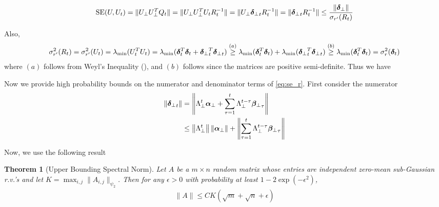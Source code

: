 \documentclass[10pt]{article}
\newtheorem{theorem}{Theorem}
\newcommand{\norm}[1]{\left\|#1\right\|}
\newcommand{\SE}{\mathrm{SE}}
\begin{document}
\begin{align*}
\SE(U, U_t) = \|U_\perp U_\perp^T Q_t\| = \|U_\perp U_\perp^T U_t R_t^{-1}\|  = \|U_\perp \utsin_t R_t^{-1}\| = \|\utsin_t R_t^{-1}\| \leq \frac{\|\utsin\|}{\sigma_{r'}(R_t)}
\end{align*}


Also,
\begin{align}\label{eq:se_r}
\sigma_{r'}^2(R_t) = \sigma_{r'}^2(U_t) = \lambda_{\min}(U_t^T U_t) = \lambda_{\min}(\bm{\delta}_t^T \bm{\delta}_t + {\bm{\delta}_{\perp}}_t^T {\bm{\delta}_{\perp}}_t) \overset{(a)}{\geq} \lambda_{\min}(\bm{\delta}_t^T \bm{\delta}_t) + \lambda_{\min}({\bm{\delta}_{\perp}}_t^T {\bm{\delta}_{\perp}}_t) \overset{(b)}{\geq} \lambda_{\min}(\bm{\delta}_t^T \bm{\delta}_t) = \sigma_{r}^2(\bm{\delta}_t)
\end{align}
where $(a)$ follows from Weyl's Inequality (\cite[Theorem 4.3.1]{horn_johnson}), and $(b)$ follows since the matrices are positive semi-definite. Thus we have 


%

\noindent Now we provide high probability bounds on the numerator and denominator terms of \eqref{eq:se_r}. First consider the numerator 
\begin{align*}
\|\utsin_t\| &= \norm{\Lambda_\perp^t \usin + \sum_{\tau=1}^t \Lambda_\perp^{t-\tau} \wsin_\tau} \\
&\leq \norm{\Lambda_\perp^t} \norm{\usin} + \norm{\sum_{\tau=1}^t \Lambda_\perp^{t-\tau} \wsin_\tau} 
\end{align*}


Now, we use the following result \cite[Theorem 4.4.5]{hdp_book} 
\begin{theorem}[Upper Bounding Spectral Norm] \label{thm:upper_bnd}
Let $A$ be a $m \times n$ random matrix whose entries are independent zero-mean sub-Gaussian r.v.'s and let $K = \max_{i,j} \|A_{i,j}\|_{\psi_2}$. Then for any $\epsilon >0$ with probability at least $1 - 2\exp(-\epsilon^2)$,
\begin{align*}
\|A\| \leq C K (\sqrt{m} + \sqrt{n} + \epsilon) 
\end{align*}
\end{theorem}
\end{document}
